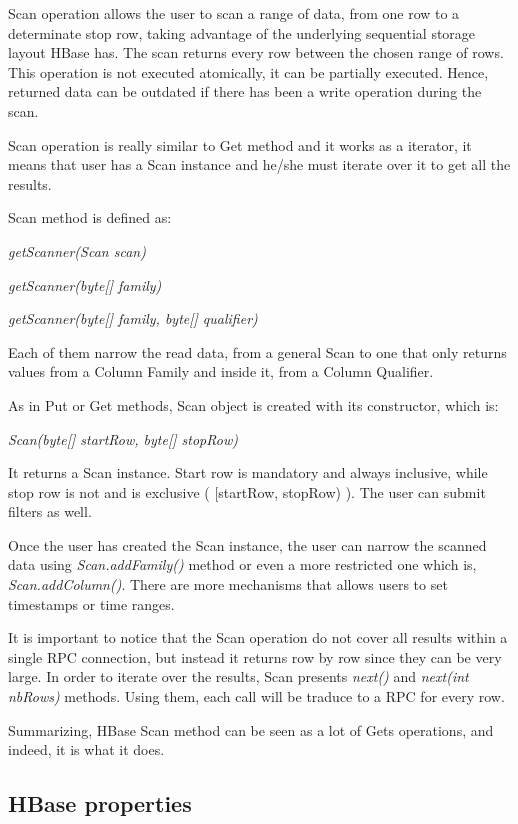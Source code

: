 Scan operation allows the user to scan a range of data, from one row to a determinate stop row, taking advantage of the underlying sequential storage layout HBase has. The scan returns every row between the chosen range of rows. This operation is not executed atomically, it can be partially executed. Hence, returned data can be outdated if there has been a write operation during the scan. 
\par
Scan operation is really similar to Get method and it works as a iterator, it means that user has a Scan instance and he/she must iterate over it to get all the results.
\par
Scan method is defined as:
\par
\bigskip
\centerline{\textit{getScanner(Scan scan)}}
\centerline{\textit{getScanner(byte[] family)}}
\centerline{\textit{getScanner(byte[] family, byte[] qualifier)}}
\bigskip
Each of them narrow the read data, from a general Scan to one that only returns values from a Column Family and inside it, from a Column Qualifier.
\par
As in Put or Get methods, Scan object is created with its constructor, which is:
\par
\bigskip
\centerline{\textit{Scan(byte[] startRow, byte[] stopRow)}}
\bigskip

It returns a Scan instance. Start row is mandatory and always inclusive, while stop row is not and is exclusive ( [startRow, stopRow) ). The user can submit filters as well.
\par
Once the user has created the Scan instance, the user can narrow the scanned data using \textit{Scan.addFamily()} method or even a more restricted  one which is, \textit{Scan.addColumn()}. There are more mechanisms that allows users to set timestamps or time ranges.
\par
It is important to notice that the Scan operation do not cover all results within a single RPC connection, but instead it returns row by row since they can be very large. In order to iterate over the results, Scan presents \textit{next()} and \textit{next(int nbRows)} methods. Using them, each call will be traduce to a RPC for every row.
\par
Summarizing, HBase Scan method can be seen as  a lot of Gets operations, and indeed, it is what it does.


\subsection{HBase properties}

